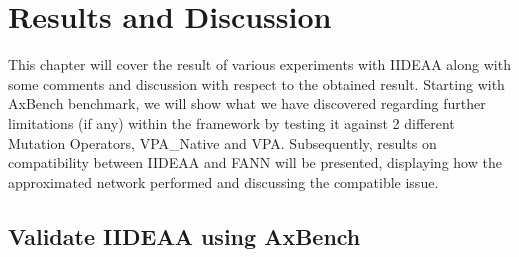 \chapter{Results and Discussion}

This chapter will cover the result of various experiments with IIDEAA along with some comments and discussion with respect to the obtained result. Starting with AxBench benchmark, we will show what we have discovered regarding further limitations (if any) within the framework by testing it against 2 different Mutation Operators, VPA\_Native and VPA. Subsequently, results on compatibility between IIDEAA and FANN will be presented, displaying how the approximated network performed and discussing the compatible issue. \\

\section{Validate IIDEAA using AxBench}

